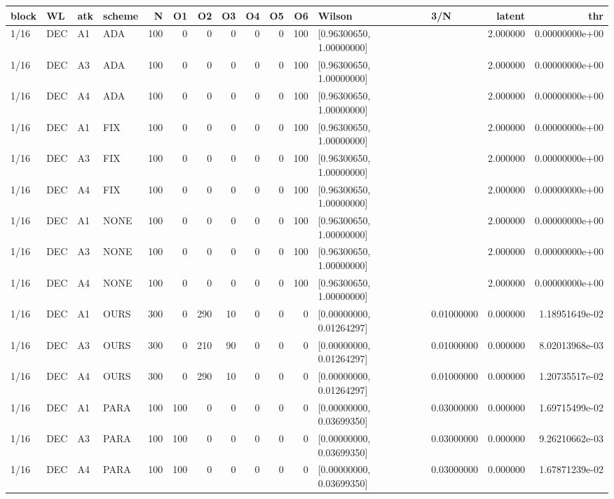 \begin{tabular}{ll ll r rrrrrr l l r r}
\hline
block & WL & atk & scheme & N & O1 & O2 & O3 & O4 & O5 & O6 & Wilson & 3/N & latent & thr \\
\hline
1/16 & DEC & A1 & ADA & 100 & 0 & 0 & 0 & 0 & 0 & 100 & [0.96300650, 1.00000000] &  & 2.000000 & 0.00000000e+00 \\
1/16 & DEC & A3 & ADA & 100 & 0 & 0 & 0 & 0 & 0 & 100 & [0.96300650, 1.00000000] &  & 2.000000 & 0.00000000e+00 \\
1/16 & DEC & A4 & ADA & 100 & 0 & 0 & 0 & 0 & 0 & 100 & [0.96300650, 1.00000000] &  & 2.000000 & 0.00000000e+00 \\
1/16 & DEC & A1 & FIX & 100 & 0 & 0 & 0 & 0 & 0 & 100 & [0.96300650, 1.00000000] &  & 2.000000 & 0.00000000e+00 \\
1/16 & DEC & A3 & FIX & 100 & 0 & 0 & 0 & 0 & 0 & 100 & [0.96300650, 1.00000000] &  & 2.000000 & 0.00000000e+00 \\
1/16 & DEC & A4 & FIX & 100 & 0 & 0 & 0 & 0 & 0 & 100 & [0.96300650, 1.00000000] &  & 2.000000 & 0.00000000e+00 \\
1/16 & DEC & A1 & NONE & 100 & 0 & 0 & 0 & 0 & 0 & 100 & [0.96300650, 1.00000000] &  & 2.000000 & 0.00000000e+00 \\
1/16 & DEC & A3 & NONE & 100 & 0 & 0 & 0 & 0 & 0 & 100 & [0.96300650, 1.00000000] &  & 2.000000 & 0.00000000e+00 \\
1/16 & DEC & A4 & NONE & 100 & 0 & 0 & 0 & 0 & 0 & 100 & [0.96300650, 1.00000000] &  & 2.000000 & 0.00000000e+00 \\
1/16 & DEC & A1 & OURS & 300 & 0 & 290 & 10 & 0 & 0 & 0 & [0.00000000, 0.01264297] & 0.01000000 & 0.000000 & 1.18951649e-02 \\
1/16 & DEC & A3 & OURS & 300 & 0 & 210 & 90 & 0 & 0 & 0 & [0.00000000, 0.01264297] & 0.01000000 & 0.000000 & 8.02013968e-03 \\
1/16 & DEC & A4 & OURS & 300 & 0 & 290 & 10 & 0 & 0 & 0 & [0.00000000, 0.01264297] & 0.01000000 & 0.000000 & 1.20735517e-02 \\
1/16 & DEC & A1 & PARA & 100 & 100 & 0 & 0 & 0 & 0 & 0 & [0.00000000, 0.03699350] & 0.03000000 & 0.000000 & 1.69715499e-02 \\
1/16 & DEC & A3 & PARA & 100 & 100 & 0 & 0 & 0 & 0 & 0 & [0.00000000, 0.03699350] & 0.03000000 & 0.000000 & 9.26210662e-03 \\
1/16 & DEC & A4 & PARA & 100 & 100 & 0 & 0 & 0 & 0 & 0 & [0.00000000, 0.03699350] & 0.03000000 & 0.000000 & 1.67871239e-02 \\

\end{tabular}
